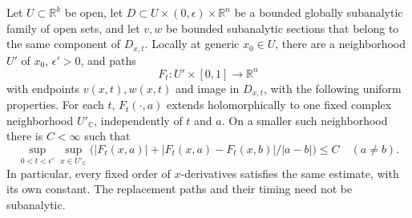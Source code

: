 \begin{lemma}
\label{lem:loc-paths}
Let $U\subset\mathbb{R}^k$ be open, let $D\subset U\times(0,\epsilon)\times\mathbb{R}^n$ be a bounded globally subanalytic family of open sets, and let $v,w$ be bounded subanalytic sections that belong to the same component of $D_{x,t}$. Locally at generic $x_0\in U$, there are a neighborhood $U'$ of $x_0$, $\epsilon'>0$, and paths
\[
 F_t:U'\times[0,1]\longrightarrow\mathbb{R}^n
\]
with endpoints $v(x,t),w(x,t)$ and image in $D_{x,t}$, with the following uniform properties.  For each $t$, $F_t(\cdot,a)$ extends holomorphically to one fixed complex neighborhood $U'_{\mathbb{C}}$, independently of $t$ and $a$.  On a smaller such neighborhood there is $C<\infty$ such that
\begin{equation}\label{eq:loc-path-estimate}
 \sup_{0<t<\epsilon'}\sup_{x\in U'_{\mathbb{C}}}
 \bigl(|F_t(x,a)|+|F_t(x,a)-F_t(x,b)|/|a-b|\bigr)\leq C
 \quad(a\ne b).
\end{equation}
In particular, every fixed order of $x$-derivatives satisfies the same estimate, with its own constant.  The replacement paths and their timing need not be subanalytic.
\end{lemma}

